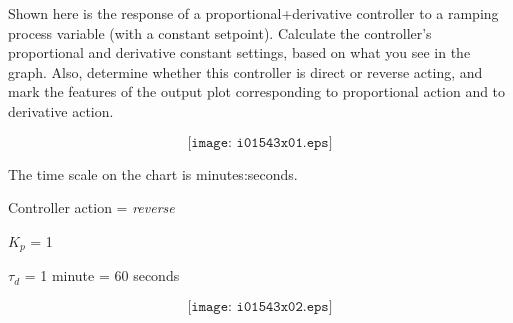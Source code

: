

Shown here is the response of a proportional+derivative controller to a ramping process variable (with a constant setpoint).  Calculate the controller's proportional and derivative constant settings, based on what you see in the graph.  Also, determine whether this controller is direct or reverse acting, and mark the features of the output plot corresponding to proportional action and to derivative action.

$$\texttt{[image: i01543x01.eps]}$$

The time scale on the chart is minutes:seconds.







Controller action = {\it reverse}

\vskip 10pt

$K_p$ = 1

\vskip 10pt

$\tau_d$ = 1 minute = 60 seconds

\vskip 10pt

$$\texttt{[image: i01543x02.eps]}$$












